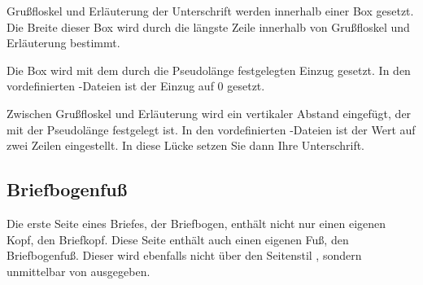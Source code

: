\begin{Declaration}
\end{Declaration}
Grußfloskel und Erläuterung der
Unterschrift werden innerhalb einer Box gesetzt.  Die
Breite dieser Box wird durch die längste Zeile innerhalb von Grußfloskel und
Erläuterung bestimmt.

Die Box wird mit dem durch die Pseudolänge  festgelegten
Einzug gesetzt. In den vordefinierten
-Dateien ist der Einzug auf 0 gesetzt.

Zwischen Grußfloskel und Erläuterung wird ein vertikaler Abstand eingefügt,
der mit der Pseudolänge  festgelegt ist. In den
vordefinierten -Dateien ist der Wert auf
zwei Zeilen eingestellt. In diese Lücke setzen Sie dann Ihre Unterschrift.%
%
\EndIndexGroup
% 
\EndIndexGroup


\subsection{Briefbogenfuß}
%
\BeginIndexGroup
{}%

Die erste Seite eines Briefes, der Briefbogen, enthält nicht nur einen eigenen
Kopf, den Briefkopf. Diese Seite enthält auch einen eigenen
Fuß, den Briefbogenfuß. %
\iftrue%
Dieser wird ebenfalls nicht über den Seitenstil%
\else%
Genau wie der Briefkopf wird der Briefbogenfuß nicht über den Seitenstil%
\fi%
, sondern unmittelbar von %
 ausgegeben.


